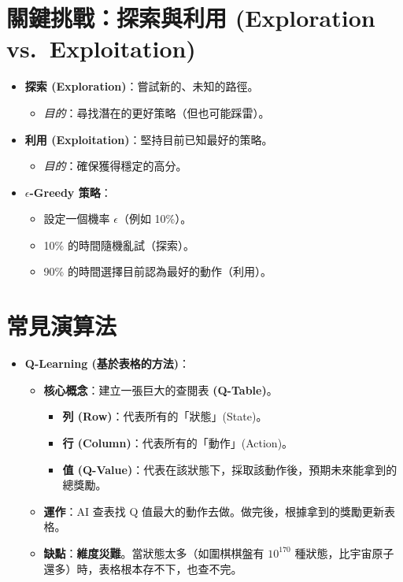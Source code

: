 \documentclass[
  letterpaper,
  DIV=11,
  numbers=noendperiod]{scrreprt}
\providecommand{\tightlist}{%
  \setlength{\itemsep}{0pt}\setlength{\parskip}{0pt}}
\begin{document}
\section{關鍵挑戰：探索與利用 (Exploration
vs.~Exploitation)}\label{ux95dcux9375ux6311ux6230ux63a2ux7d22ux8207ux5229ux7528-exploration-vs.-exploitation}

\begin{itemize}
\tightlist
\item
  \textbf{探索 (Exploration)}：嘗試新的、未知的路徑。

  \begin{itemize}
  \tightlist
  \item
    \emph{目的}：尋找潛在的更好策略（但也可能踩雷）。
  \end{itemize}
\item
  \textbf{利用 (Exploitation)}：堅持目前已知最好的策略。

  \begin{itemize}
  \tightlist
  \item
    \emph{目的}：確保獲得穩定的高分。
  \end{itemize}
\item
  \textbf{\(\epsilon\)-Greedy 策略}：

  \begin{itemize}
  \tightlist
  \item
    設定一個機率 \(\epsilon\)（例如 10\%）。
  \item
    10\% 的時間隨機亂試（探索）。
  \item
    90\% 的時間選擇目前認為最好的動作（利用）。
  \end{itemize}
\end{itemize}

\section{常見演算法}\label{sec-rl-algorithms}

\begin{itemize}
\tightlist
\item
  \textbf{Q-Learning (基於表格的方法)}：

  \begin{itemize}
  \tightlist
  \item
    \textbf{核心概念}：建立一張巨大的查閱表 \textbf{(Q-Table)}。

    \begin{itemize}
    \tightlist
    \item
      \textbf{列 (Row)}：代表所有的「狀態」(State)。
    \item
      \textbf{行 (Column)}：代表所有的「動作」(Action)。
    \item
      \textbf{值
      (Q-Value)}：代表在該狀態下，採取該動作後，預期未來能拿到的總獎勵。
    \end{itemize}
  \item
    \textbf{運作}：AI 查表找 Q
    值最大的動作去做。做完後，根據拿到的獎勵更新表格。
  \item
    \textbf{缺點}：\textbf{維度災難}。當狀態太多（如圍棋棋盤有
    \(10^{170}\) 種狀態，比宇宙原子還多）時，表格根本存不下，也查不完。
  \end{itemize}
\end{itemize}
\end{document}
